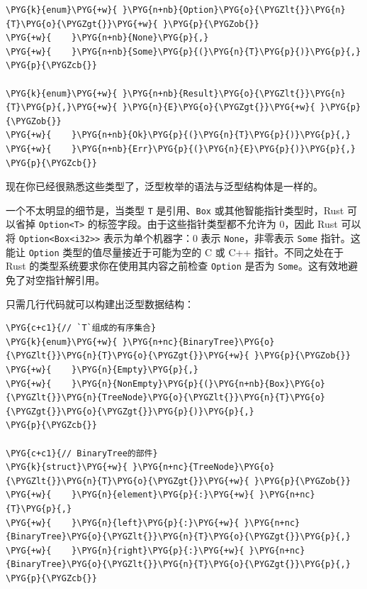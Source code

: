 \begin{Verbatim}[commandchars=\\\{\},breaklines=true,breakanywhere=true,fontsize=\codefont,xleftmargin=17bp]
\PYG{k}{enum}\PYG{+w}{ }\PYG{n+nb}{Option}\PYG{o}{\PYGZlt{}}\PYG{n}{T}\PYG{o}{\PYGZgt{}}\PYG{+w}{ }\PYG{p}{\PYGZob{}}
\PYG{+w}{    }\PYG{n+nb}{None}\PYG{p}{,}
\PYG{+w}{    }\PYG{n+nb}{Some}\PYG{p}{(}\PYG{n}{T}\PYG{p}{)}\PYG{p}{,}
\PYG{p}{\PYGZcb{}}

\PYG{k}{enum}\PYG{+w}{ }\PYG{n+nb}{Result}\PYG{o}{\PYGZlt{}}\PYG{n}{T}\PYG{p}{,}\PYG{+w}{ }\PYG{n}{E}\PYG{o}{\PYGZgt{}}\PYG{+w}{ }\PYG{p}{\PYGZob{}}
\PYG{+w}{    }\PYG{n+nb}{Ok}\PYG{p}{(}\PYG{n}{T}\PYG{p}{)}\PYG{p}{,}
\PYG{+w}{    }\PYG{n+nb}{Err}\PYG{p}{(}\PYG{n}{E}\PYG{p}{)}\PYG{p}{,}
\PYG{p}{\PYGZcb{}}
\end{Verbatim}

现在你已经很熟悉这些类型了，泛型枚举的语法与泛型结构体是一样的。

一个不太明显的细节是，当类型 \texttt{T} 是引用、\texttt{Box} 或其他智能指针类型时，Rust 可以省掉 \texttt{Option<T>} 的标签字段。由于这些指针类型都不允许为 0，因此 Rust 可以将 \texttt{Option<Box<i32>>} 表示为单个机器字：0 表示 \texttt{None}，非零表示 \texttt{Some} 指针。这能让 \texttt{Option} 类型的值尽量接近于可能为空的 C 或 C++ 指针。不同之处在于 Rust 的类型系统要求你在使用其内容之前检查 \texttt{Option} 是否为 \texttt{Some}。这有效地避免了对空指针解引用。

只需几行代码就可以构建出泛型数据结构：

\begin{Verbatim}[commandchars=\\\{\},breaklines=true,breakanywhere=true,fontsize=\codefont,xleftmargin=17bp]
\PYG{c+c1}{// `T`组成的有序集合}
\PYG{k}{enum}\PYG{+w}{ }\PYG{n+nc}{BinaryTree}\PYG{o}{\PYGZlt{}}\PYG{n}{T}\PYG{o}{\PYGZgt{}}\PYG{+w}{ }\PYG{p}{\PYGZob{}}
\PYG{+w}{    }\PYG{n}{Empty}\PYG{p}{,}
\PYG{+w}{    }\PYG{n}{NonEmpty}\PYG{p}{(}\PYG{n+nb}{Box}\PYG{o}{\PYGZlt{}}\PYG{n}{TreeNode}\PYG{o}{\PYGZlt{}}\PYG{n}{T}\PYG{o}{\PYGZgt{}}\PYG{o}{\PYGZgt{}}\PYG{p}{)}\PYG{p}{,}
\PYG{p}{\PYGZcb{}}

\PYG{c+c1}{// BinaryTree的部件}
\PYG{k}{struct}\PYG{+w}{ }\PYG{n+nc}{TreeNode}\PYG{o}{\PYGZlt{}}\PYG{n}{T}\PYG{o}{\PYGZgt{}}\PYG{+w}{ }\PYG{p}{\PYGZob{}}
\PYG{+w}{    }\PYG{n}{element}\PYG{p}{:}\PYG{+w}{ }\PYG{n+nc}{T}\PYG{p}{,}
\PYG{+w}{    }\PYG{n}{left}\PYG{p}{:}\PYG{+w}{ }\PYG{n+nc}{BinaryTree}\PYG{o}{\PYGZlt{}}\PYG{n}{T}\PYG{o}{\PYGZgt{}}\PYG{p}{,}
\PYG{+w}{    }\PYG{n}{right}\PYG{p}{:}\PYG{+w}{ }\PYG{n+nc}{BinaryTree}\PYG{o}{\PYGZlt{}}\PYG{n}{T}\PYG{o}{\PYGZgt{}}\PYG{p}{,}
\PYG{p}{\PYGZcb{}}
\end{Verbatim}

